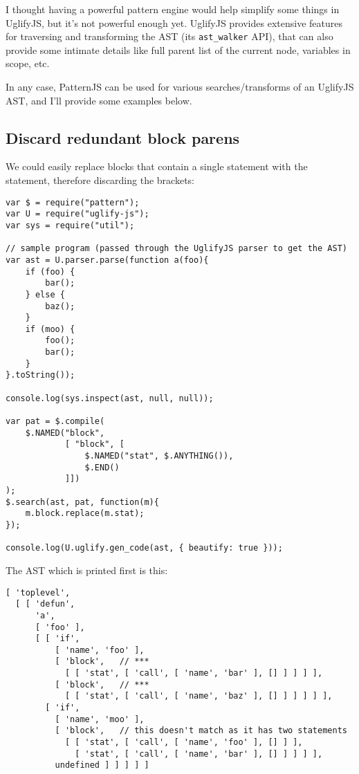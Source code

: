 \documentclass[a4paper,10pt]{article}
\begin{document}
I thought having a powerful pattern engine would help simplify some things
in UglifyJS, but it's not powerful enough yet.  UglifyJS provides extensive
features for traversing and transforming the AST (its \texttt{ast\_walker} API),
that can also provide some intimate details like full parent list of the
current node, variables in scope, etc.

In any case, PatternJS can be used for various searches/transforms of an
UglifyJS AST, and I'll provide some examples below.
\subsection{Discard redundant block parens}
\label{sec-3-1}


We could easily replace blocks that contain a single statement with the
statement, therefore discarding the brackets:


\begin{verbatim}
var $ = require("pattern");
var U = require("uglify-js");
var sys = require("util");

// sample program (passed through the UglifyJS parser to get the AST)
var ast = U.parser.parse(function a(foo){
    if (foo) {
        bar();
    } else {
        baz();
    }
    if (moo) {
        foo();
        bar();
    }
}.toString());

console.log(sys.inspect(ast, null, null));

var pat = $.compile(
    $.NAMED("block",
            [ "block", [
                $.NAMED("stat", $.ANYTHING()),
                $.END()
            ]])
);
$.search(ast, pat, function(m){
    m.block.replace(m.stat);
});

console.log(U.uglify.gen_code(ast, { beautify: true }));
\end{verbatim}

The AST which is printed first is this:


\begin{verbatim}
[ 'toplevel',
  [ [ 'defun',
      'a',
      [ 'foo' ],
      [ [ 'if',
          [ 'name', 'foo' ],
          [ 'block',   // ***
            [ [ 'stat', [ 'call', [ 'name', 'bar' ], [] ] ] ] ],
          [ 'block',   // ***
            [ [ 'stat', [ 'call', [ 'name', 'baz' ], [] ] ] ] ] ],
        [ 'if',
          [ 'name', 'moo' ],
          [ 'block',   // this doesn't match as it has two statements
            [ [ 'stat', [ 'call', [ 'name', 'foo' ], [] ] ],
              [ 'stat', [ 'call', [ 'name', 'bar' ], [] ] ] ] ],
          undefined ] ] ] ] ]
\end{verbatim}
\end{document}
